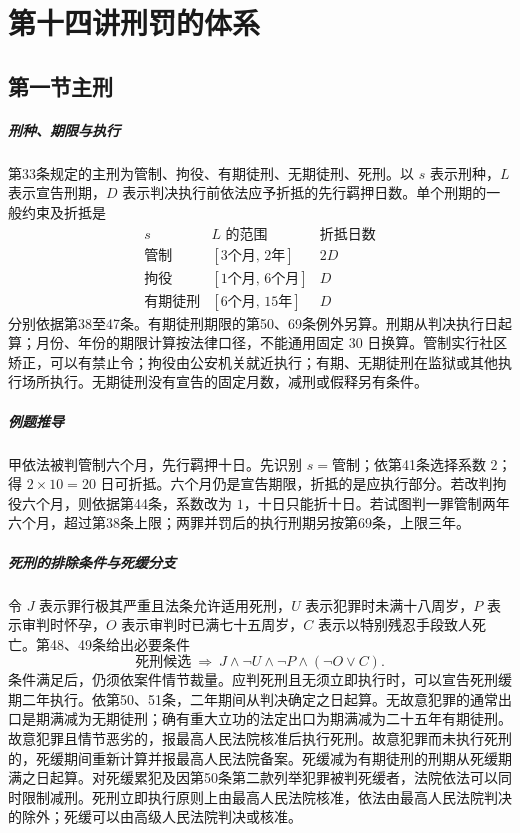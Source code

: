 \chapter{第十四讲\quad 刑罚的体系}
\label{lecture:14}
\par

\section{第一节\quad 主刑}
\paragraph{刑种、期限与执行}
第33条规定的主刑为管制、拘役、有期徒刑、无期徒刑、死刑。以 \(s\) 表示刑种，\(L\) 表示宣告刑期，\(D\) 表示判决执行前依法应予折抵的先行羁押日数。单个刑期的一般约束及折抵是
\[
\begin{array}{c|c|c}
s & L\text{ 的范围} & \text{折抵日数}\\ \hline
\text{管制} & [3\text{个月},\,2\text{年}] & 2D\\
\text{拘役} & [1\text{个月},\,6\text{个月}] & D\\
\text{有期徒刑} & [6\text{个月},\,15\text{年}] & D
\end{array}
\]
分别依据第38至47条。有期徒刑期限的第50、69条例外另算。刑期从判决执行日起算；月份、年份的期限计算按法律口径，不能通用固定 \(30\) 日换算。管制实行社区矫正，可以有禁止令；拘役由公安机关就近执行；有期、无期徒刑在监狱或其他执行场所执行。无期徒刑没有宣告的固定月数，减刑或假释另有条件。

\paragraph{例题推导}
甲依法被判管制六个月，先行羁押十日。先识别 \(s=\text{管制}\)；依第41条选择系数 \(2\)；得 \(2\times10=20\) 日可折抵。六个月仍是宣告期限，折抵的是应执行部分。若改判拘役六个月，则依据第44条，系数改为 \(1\)，十日只能折十日。若试图判一罪管制两年六个月，超过第38条上限；两罪并罚后的执行刑期另按第69条，上限三年。

\paragraph{死刑的排除条件与死缓分支}
令 \(J\) 表示罪行极其严重且法条允许适用死刑，\(U\) 表示犯罪时未满十八周岁，\(P\) 表示审判时怀孕，\(O\) 表示审判时已满七十五周岁，\(C\) 表示以特别残忍手段致人死亡。第48、49条给出必要条件
\[
 \text{死刑候选}\ \Longrightarrow\
 J\land\neg U\land\neg P\land(\neg O\lor C).
\]
条件满足后，仍须依案件情节裁量。应判死刑且无须立即执行时，可以宣告死刑缓期二年执行。依第50、51条，二年期间从判决确定之日起算。无故意犯罪的通常出口是期满减为无期徒刑；确有重大立功的法定出口为期满减为二十五年有期徒刑。故意犯罪且情节恶劣的，报最高人民法院核准后执行死刑。故意犯罪而未执行死刑的，死缓期间重新计算并报最高人民法院备案。死缓减为有期徒刑的刑期从死缓期满之日起算。对死缓累犯及因第50条第二款列举犯罪被判死缓者，法院依法可以同时限制减刑。死刑立即执行原则上由最高人民法院核准，依法由最高人民法院判决的除外；死缓可以由高级人民法院判决或核准。


